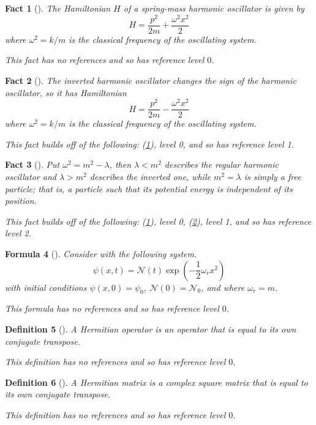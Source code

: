 \documentclass{article}
\newtheorem{definition}{Definition}
\newtheorem{fact}[definition]{Fact}
\newtheorem{formula}[definition]{Formula}
\begin{document}
\begin{fact}[]\label{7}The Hamiltonian $H$ of a spring-mass harmonic oscillator is given by\begin{equation}H=\frac{p^2}{2m}+\frac{\omega^2x^2}{2}\end{equation}
 where $\omega^2=k/m$ is the classical frequency of the oscillating system.
 
 This fact has no references and so has reference level $0$.\end{fact}
\begin{fact}[]\label{8}The inverted harmonic oscillator changes the sign of the harmonic oscillator,
 so it has Hamiltonian\begin{equation}H=\frac{p^2}{2m}-\frac{\omega^2x^2}{2}\end{equation}
 where $\omega^2=k/m$ is the classical frequency of the oscillating system.
 
 This fact builds off of the following: (\ref{7}), level 0, and so has reference level 1.\end{fact}
\begin{fact}[]\label{9}Put $\omega^2=m^2-\lambda$, then $\lambda<m^2$ describes the
 regular harmonic oscillator and $\lambda>m^2$ describes the inverted one, while
 $m^2=\lambda$ is simply a free particle; that is, a particle such that its potential energy
 is independent of its position.
 
 This fact builds off of the following: (\ref{7}), level 0, (\ref{8}), level 1, and so has reference level 2.\end{fact}
\begin{formula}[]\label{10}Consider with the following system. 
 $$\psi(x,t)=\mathcal{N}(t)\exp\left(-\frac{1}{2}\omega_r x^2\right)$$
 with initial conditions $\psi(x,0)=\psi_0,~\mathcal{N}(0)=\mathcal{N}_0$, 
 and where $\omega_r=m$.
 
 This formula has no references and so has reference level $0$.\end{formula}
\begin{definition}[]\label{11}A Hermitian operator is an operator that is equal 
 to its own conjugate transpose.
 
 This definition has no references and so has reference level $0$.\end{definition}
\begin{definition}[]\label{12}A Hermitian matrix is a complex square 
 matrix that is equal to its own conjugate transpose.
 
 This definition has no references and so has reference level $0$.\end{definition}
\end{document}
